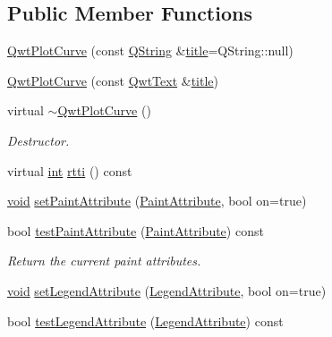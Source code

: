 \subsection*{Public Member Functions}
\begin{DoxyCompactItemize}
\item 
\hyperlink{class_qwt_plot_curve_ac7d2d9e21ee3e054b51fb954cf95c820}{Qwt\-Plot\-Curve} (const \hyperlink{group___u_a_v_objects_plugin_gab9d252f49c333c94a72f97ce3105a32d}{Q\-String} \&\hyperlink{class_qwt_plot_item_a3859d011b670b5f89e45d1ccef9206f7}{title}=Q\-String\-::null)
\item 
\hyperlink{class_qwt_plot_curve_a3bcaa88363509f4bc1ad92bee498f203}{Qwt\-Plot\-Curve} (const \hyperlink{class_qwt_text}{Qwt\-Text} \&\hyperlink{class_qwt_plot_item_a3859d011b670b5f89e45d1ccef9206f7}{title})
\item 
virtual \hyperlink{class_qwt_plot_curve_aa05ec6d3883821a8e62330fbeeb85dbd}{$\sim$\-Qwt\-Plot\-Curve} ()
\begin{DoxyCompactList}\small\item\em Destructor. \end{DoxyCompactList}\item 
virtual \hyperlink{ioapi_8h_a787fa3cf048117ba7123753c1e74fcd6}{int} \hyperlink{class_qwt_plot_curve_a1cb75062e781f4e0839a6cd2081c3928}{rtti} () const 
\item 
\hyperlink{group___u_a_v_objects_plugin_ga444cf2ff3f0ecbe028adce838d373f5c}{void} \hyperlink{class_qwt_plot_curve_a7f9c70366415b5cb068af80be5bf3748}{set\-Paint\-Attribute} (\hyperlink{class_qwt_plot_curve_a96db1b854c63bfbc452c943251a11b66}{Paint\-Attribute}, bool on=true)
\item 
bool \hyperlink{class_qwt_plot_curve_ad262cf6b8448d3cb693cbceecc6d8481}{test\-Paint\-Attribute} (\hyperlink{class_qwt_plot_curve_a96db1b854c63bfbc452c943251a11b66}{Paint\-Attribute}) const 
\begin{DoxyCompactList}\small\item\em Return the current paint attributes. \end{DoxyCompactList}\item 
\hyperlink{group___u_a_v_objects_plugin_ga444cf2ff3f0ecbe028adce838d373f5c}{void} \hyperlink{class_qwt_plot_curve_a0b1b7816e822607eb16e6eb2fd7bfa5c}{set\-Legend\-Attribute} (\hyperlink{class_qwt_plot_curve_a6c1ac1ca99c06598c4044dd2ceeb9fd7}{Legend\-Attribute}, bool on=true)
\item 
bool \hyperlink{class_qwt_plot_curve_a7ca93712e476c18995e396425e451039}{test\-Legend\-Attribute} (\hyperlink{class_qwt_plot_curve_a6c1ac1ca99c06598c4044dd2ceeb9fd7}{Legend\-Attribute}) const 

\end{DoxyCompactItemize}

